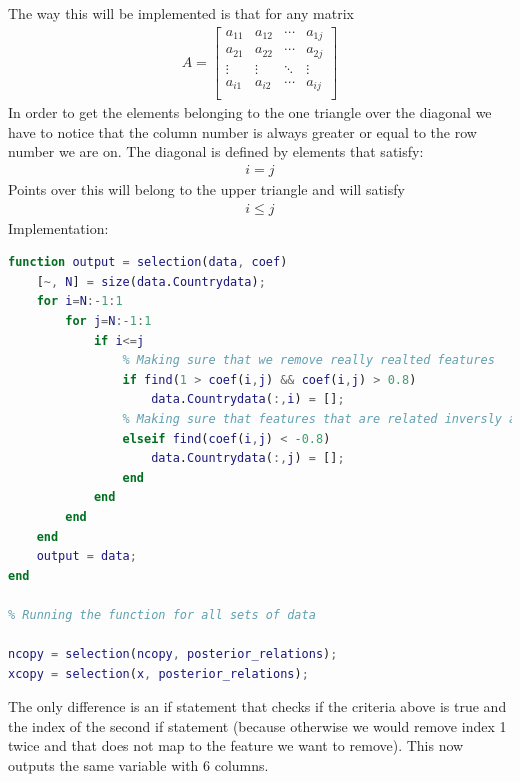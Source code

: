 \documentclass[12pt, a4paper]{article}
\begin{document}
The way this will be implemented is that for any matrix
\begin{equation*}
    \begin{split}    
        A = \left[\begin{matrix}
            a_{11} & a_{12} & \cdots & a_{1j} \\
            a_{21} & a_{22} & \cdots & a_{2j} \\
            \vdots & \vdots & \ddots & \vdots \\
            a_{i1} & a_{i2} & \cdots & a_{ij} \\
        \end{matrix}\right]
    \end{split}
\end{equation*}
In order to get the elements belonging to the one triangle over the diagonal we have to notice that the column number is always greater or equal to the row number we are on.
The diagonal is defined by elements that satisfy:
\begin{equation*}
    \begin{split}    
        i = j
    \end{split}
\end{equation*}
Points over this will belong to the upper triangle and will satisfy
\begin{equation*}
    \begin{split}    
        i \leq j
    \end{split}
\end{equation*}
Implementation:
\begin{lstlisting}[language=Matlab, label=lst:feat2, caption=The code that selects features to keep (attempt 2).]
% Deciding what features to use since some of them are evidently related very much
function output = selection(data, coef)
    [~, N] = size(data.Countrydata);
    for i=N:-1:1
        for j=N:-1:1
            if i<=j
                % Making sure that we remove really realted features
                if find(1 > coef(i,j) && coef(i,j) > 0.8)
                    data.Countrydata(:,i) = [];
                % Making sure that features that are related inversly are removed
                elseif find(coef(i,j) < -0.8)
                    data.Countrydata(:,j) = [];
                end
            end
        end
    end
    output = data;
end

% Running the function for all sets of data

ncopy = selection(ncopy, posterior_relations);
xcopy = selection(x, posterior_relations);
\end{lstlisting}
The only difference is an if statement that checks if the criteria above is true and the index of the second if statement (because otherwise we would remove index 1 twice and that does not map to the feature we want to remove). This now outputs the same variable with 6 columns.
\newline
\end{document}

